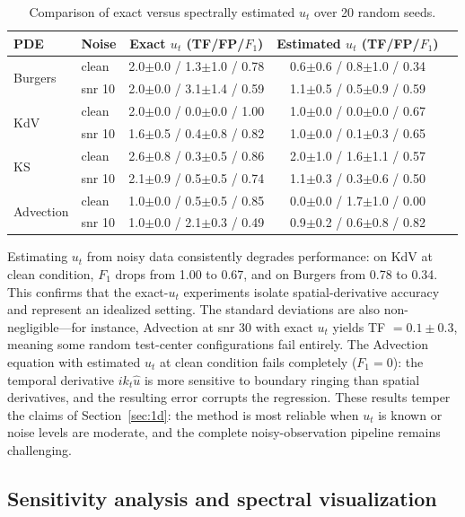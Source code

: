 \documentclass[preprint,12pt]{elsarticle}
\begin{document}
\begin{table}[H]
\centering
\caption{Comparison of exact versus spectrally estimated $u_t$ over 20 random seeds.}
\label{tab:noisy_ut}
\small
\begin{tabular}{llccc}
\toprule
PDE & Noise & Exact $u_t$ (TF/FP/$F_1$) & Estimated $u_t$ (TF/FP/$F_1$) \\
\midrule
\multirow{2}{*}{Burgers}
& clean & 2.0$\pm$0.0 / 1.3$\pm$1.0 / 0.78 & 0.6$\pm$0.6 / 0.8$\pm$1.0 / 0.34 \\
& snr 10 & 2.0$\pm$0.0 / 3.1$\pm$1.4 / 0.59 & 1.1$\pm$0.5 / 0.5$\pm$0.9 / 0.59 \\
\multirow{2}{*}{KdV}
& clean & 2.0$\pm$0.0 / 0.0$\pm$0.0 / 1.00 & 1.0$\pm$0.0 / 0.0$\pm$0.0 / 0.67 \\
& snr 10 & 1.6$\pm$0.5 / 0.4$\pm$0.8 / 0.82 & 1.0$\pm$0.0 / 0.1$\pm$0.3 / 0.65 \\
\multirow{2}{*}{KS}
& clean & 2.6$\pm$0.8 / 0.3$\pm$0.5 / 0.86 & 2.0$\pm$1.0 / 1.6$\pm$1.1 / 0.57 \\
& snr 10 & 2.1$\pm$0.9 / 0.5$\pm$0.5 / 0.74 & 1.1$\pm$0.3 / 0.3$\pm$0.6 / 0.50 \\
\multirow{2}{*}{Advection}
& clean & 1.0$\pm$0.0 / 0.5$\pm$0.5 / 0.85 & 0.0$\pm$0.0 / 1.7$\pm$1.0 / 0.00 \\
& snr 10 & 1.0$\pm$0.0 / 2.1$\pm$0.3 / 0.49 & 0.9$\pm$0.2 / 0.6$\pm$0.8 / 0.82 \\
\bottomrule
\end{tabular}
\end{table}

Estimating $u_t$ from noisy data consistently degrades performance: on KdV at clean condition, $F_1$ drops from 1.00 to 0.67, and on Burgers from 0.78 to 0.34. This confirms that the exact-$u_t$ experiments isolate spatial-derivative accuracy and represent an idealized setting. The standard deviations are also non-negligible---for instance, Advection at snr 30 with exact $u_t$ yields TF $= 0.1\pm0.3$, meaning some random test-center configurations fail entirely. The Advection equation with estimated $u_t$ at clean condition fails completely ($F_1=0$): the temporal derivative $ik_t\hat{u}$ is more sensitive to boundary ringing than spatial derivatives, and the resulting error corrupts the regression. These results temper the claims of Section~\ref{sec:1d}: the method is most reliable when $u_t$ is known or noise levels are moderate, and the complete noisy-observation pipeline remains challenging.

\subsection{Sensitivity analysis and spectral visualization}
\label{sec:sensitivity}
\end{document}
